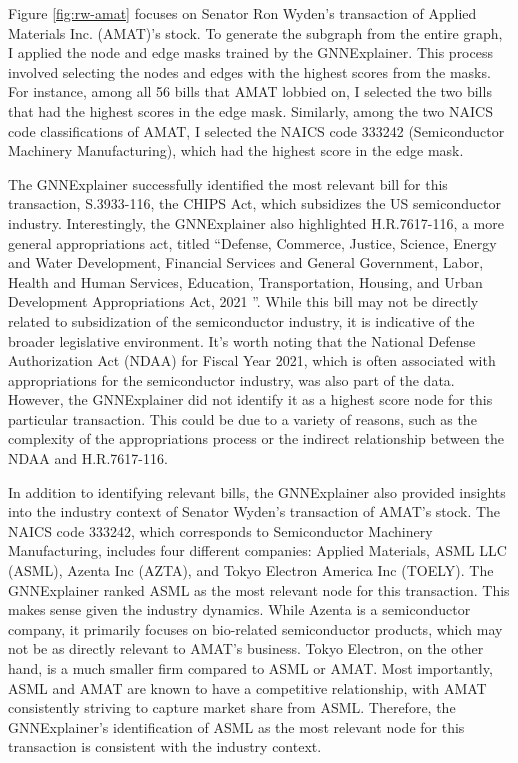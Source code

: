 \documentclass[15pt,letterpaper]{article}
\begin{document}
Figure \ref{fig:rw-amat} focuses on Senator Ron Wyden's transaction of Applied Materials Inc. (AMAT)'s stock. To generate the subgraph from the entire graph, I applied the node and edge masks trained by the GNNExplainer. This process involved selecting the nodes and edges with the highest scores from the masks. For instance, among all 56 bills that AMAT lobbied on, I selected the two bills that had the highest scores in the edge mask. Similarly, among the two NAICS code classifications of AMAT, I selected the NAICS code 333242 (Semiconductor Machinery Manufacturing), which had the highest score in the edge mask.


The GNNExplainer successfully identified the most relevant bill for this transaction, S.3933-116, the CHIPS Act, which subsidizes the US semiconductor industry. Interestingly, the GNNExplainer also highlighted H.R.7617-116, a more general appropriations act, titled ``Defense, Commerce, Justice, Science, Energy and Water Development, Financial Services and General Government, Labor, Health and Human Services, Education, Transportation, Housing, and Urban Development Appropriations Act, 2021
''. While this bill may not be directly related to subsidization of the semiconductor industry, it is indicative of the broader legislative environment. It's worth noting that the National Defense Authorization Act (NDAA) for Fiscal Year 2021, which is often associated with appropriations for the semiconductor industry, was also part of the data. However, the GNNExplainer did not identify it as a highest score node for this particular transaction. This could be due to a variety of reasons, such as the complexity of the appropriations process or the indirect relationship between the NDAA and H.R.7617-116.

In addition to identifying relevant bills, the GNNExplainer also provided insights into the industry context of Senator Wyden's transaction of AMAT's stock. The NAICS code 333242, which corresponds to Semiconductor Machinery Manufacturing, includes four different companies: Applied Materials, ASML LLC (ASML), Azenta Inc (AZTA), and Tokyo Electron America Inc (TOELY). The GNNExplainer ranked ASML as the most relevant node for this transaction. This makes sense given the industry dynamics. While Azenta is a semiconductor company, it primarily focuses on bio-related semiconductor products, which may not be as directly relevant to AMAT's business. Tokyo Electron, on the other hand, is a much smaller firm compared to ASML or AMAT. Most importantly, ASML and AMAT are known to have a competitive relationship, with AMAT consistently striving to capture market share from ASML.
Therefore, the GNNExplainer's identification of ASML as the most relevant node for this transaction is consistent with the industry context.
\end{document}
